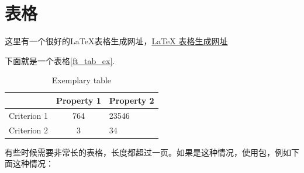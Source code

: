 \section{表格}

这里有一个很好的{LaTeX}表格生成网址，\href{https://www.tablesgenerator.com/}{LaTeX 表格生成网址}

下面就是一个表格\autoref{ft_tab_ex}.

\begin{table}[!h]
	\centering
	\begin{tabular}{l|c|l}
	\hline \hline
	
		& Property 1
		& Property 2\\ \hline
	Criterion 1
		& 764
		& 23546 \\
	Criterion 2
		& 3
		& 34 \\
	\hline \hline
	\end{tabular}
	\caption{Exemplary table}
	\label{ft_tab_ex}
\end{table}

有些时候需要非常长的表格，长度都超过一页。如果是这种情况，使用包，例如下面这种情况：


